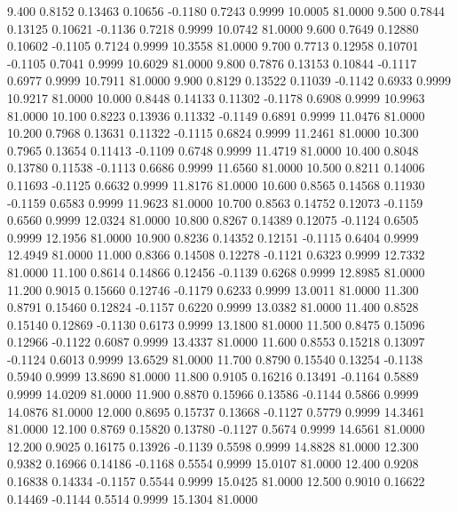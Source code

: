    9.400   0.8152   0.13463   0.10656  -0.1180   0.7243   0.9999  10.0005  81.0000
   9.500   0.7844   0.13125   0.10621  -0.1136   0.7218   0.9999  10.0742  81.0000
   9.600   0.7649   0.12880   0.10602  -0.1105   0.7124   0.9999  10.3558  81.0000
   9.700   0.7713   0.12958   0.10701  -0.1105   0.7041   0.9999  10.6029  81.0000
   9.800   0.7876   0.13153   0.10844  -0.1117   0.6977   0.9999  10.7911  81.0000
   9.900   0.8129   0.13522   0.11039  -0.1142   0.6933   0.9999  10.9217  81.0000
  10.000   0.8448   0.14133   0.11302  -0.1178   0.6908   0.9999  10.9963  81.0000
  10.100   0.8223   0.13936   0.11332  -0.1149   0.6891   0.9999  11.0476  81.0000
  10.200   0.7968   0.13631   0.11322  -0.1115   0.6824   0.9999  11.2461  81.0000
  10.300   0.7965   0.13654   0.11413  -0.1109   0.6748   0.9999  11.4719  81.0000
  10.400   0.8048   0.13780   0.11538  -0.1113   0.6686   0.9999  11.6560  81.0000
  10.500   0.8211   0.14006   0.11693  -0.1125   0.6632   0.9999  11.8176  81.0000
  10.600   0.8565   0.14568   0.11930  -0.1159   0.6583   0.9999  11.9623  81.0000
  10.700   0.8563   0.14752   0.12073  -0.1159   0.6560   0.9999  12.0324  81.0000
  10.800   0.8267   0.14389   0.12075  -0.1124   0.6505   0.9999  12.1956  81.0000
  10.900   0.8236   0.14352   0.12151  -0.1115   0.6404   0.9999  12.4949  81.0000
  11.000   0.8366   0.14508   0.12278  -0.1121   0.6323   0.9999  12.7332  81.0000
  11.100   0.8614   0.14866   0.12456  -0.1139   0.6268   0.9999  12.8985  81.0000
  11.200   0.9015   0.15660   0.12746  -0.1179   0.6233   0.9999  13.0011  81.0000
  11.300   0.8791   0.15460   0.12824  -0.1157   0.6220   0.9999  13.0382  81.0000
  11.400   0.8528   0.15140   0.12869  -0.1130   0.6173   0.9999  13.1800  81.0000
  11.500   0.8475   0.15096   0.12966  -0.1122   0.6087   0.9999  13.4337  81.0000
  11.600   0.8553   0.15218   0.13097  -0.1124   0.6013   0.9999  13.6529  81.0000
  11.700   0.8790   0.15540   0.13254  -0.1138   0.5940   0.9999  13.8690  81.0000
  11.800   0.9105   0.16216   0.13491  -0.1164   0.5889   0.9999  14.0209  81.0000
  11.900   0.8870   0.15966   0.13586  -0.1144   0.5866   0.9999  14.0876  81.0000
  12.000   0.8695   0.15737   0.13668  -0.1127   0.5779   0.9999  14.3461  81.0000
  12.100   0.8769   0.15820   0.13780  -0.1127   0.5674   0.9999  14.6561  81.0000
  12.200   0.9025   0.16175   0.13926  -0.1139   0.5598   0.9999  14.8828  81.0000
  12.300   0.9382   0.16966   0.14186  -0.1168   0.5554   0.9999  15.0107  81.0000
  12.400   0.9208   0.16838   0.14334  -0.1157   0.5544   0.9999  15.0425  81.0000
  12.500   0.9010   0.16622   0.14469  -0.1144   0.5514   0.9999  15.1304  81.0000
